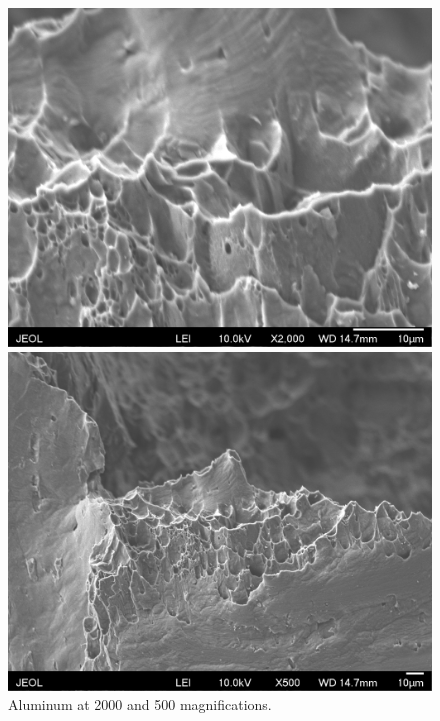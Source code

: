 \documentclass{article}
\begin{document}
\begin{figure}[h]
	\begin{minipage}{0.5\textwidth}
		\centering
		\includegraphics[scale=0.5]{Al_2kx_e.png}
	\end{minipage}
	\begin{minipage}{0.5\textwidth}
		\centering
		\includegraphics[scale=0.5]{Al_500x_e.png}
	\end{minipage}
	\caption{Aluminum at 2000 and 500 magnifications.}
\end{figure}
\end{document}
